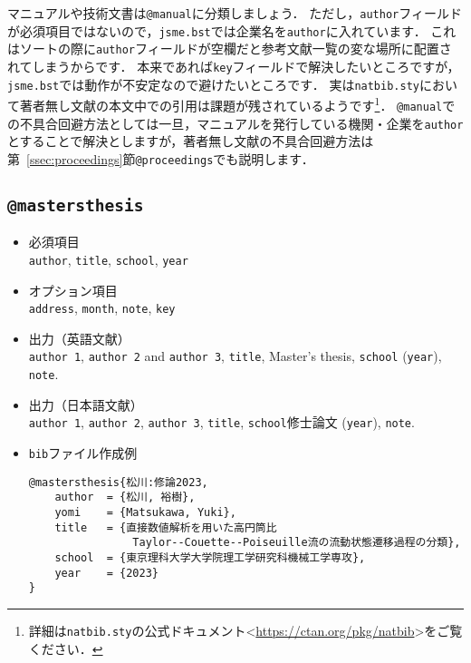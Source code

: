 \documentclass[a4paper,fleqn,uplatex,dvipdfmx]{jsarticle}
\makeatletter
\newcommand{\jsmefile}{\texttt{jsme.bst}}
\newcommand{\ttmanual}{\texttt{@manual}}
\newcommand{\ttmastersthesis}{\texttt{@mastersthesis}}
\newcommand{\ttproceedings}{\texttt{@proceedings}}
\makeatother
\begin{document}
マニュアルや技術文書は\ttmanual に分類しましょう．
ただし，\verb|author|フィールドが必須項目ではないので，\jsmefile では企業名を\verb|author|に入れています．
これはソートの際に\verb|author|フィールドが空欄だと参考文献一覧の変な場所に配置されてしまうからです．
本来であれば\verb|key|フィールドで解決したいところですが，\jsmefile では動作が不安定なので避けたいところです．
実は\verb|natbib.sty|において著者無し文献の本文中での引用は課題が残されているようです\footnote{詳細は\texttt{natbib.sty}の公式ドキュメント\textless\url{https://ctan.org/pkg/natbib}\textgreater をご覧ください．}．
\ttmanual での不具合回避方法としては一旦，マニュアルを発行している機関・企業を\verb|author|とすることで解決としますが，著者無し文献の不具合回避方法は第~\ref{ssec:proceedings}節\ttproceedings でも説明します．


\subsection{\ttmastersthesis}
\label{ssec:mastersthesis}
\begin{screen}
    \begin{itemize}
        \item 必須項目 \\
        \verb|author|, \verb|title|, \verb|school|, \verb|year|
        \item オプション項目 \\
        \verb|address|, \verb|month|, \verb|note|, \verb|key|
        \item 出力（英語文献） \\
            \colorbox[gray]{0.8}{\texttt{author 1}}, \colorbox[gray]{0.8}{\texttt{author 2}} and \colorbox[gray]{0.8}{\texttt{author 3}}, \colorbox[gray]{0.8}{\texttt{title}}, Master's thesis, \colorbox[gray]{0.8}{\texttt{school}} (\colorbox[gray]{0.8}{\texttt{year}}), \colorbox[gray]{0.8}{\texttt{note}}.
        \item 出力（日本語文献） \\
            \colorbox[gray]{0.8}{\texttt{author 1}}, \colorbox[gray]{0.8}{\texttt{author 2}}, \colorbox[gray]{0.8}{\texttt{author 3}}, \colorbox[gray]{0.8}{\texttt{title}}, \colorbox[gray]{0.8}{\texttt{school}}修士論文 (\colorbox[gray]{0.8}{\texttt{year}}), \colorbox[gray]{0.8}{\texttt{note}}.
        \item \verb|bib|ファイル作成例 \vspace{-3mm}
\begin{verbatim}
@mastersthesis{松川:修論2023,
    author  = {松川, 裕樹},
    yomi    = {Matsukawa, Yuki},
    title   = {直接数値解析を用いた高円筒比
                Taylor--Couette--Poiseuille流の流動状態遷移過程の分類},
    school  = {東京理科大学大学院理工学研究科機械工学専攻},
    year    = {2023}
}
\end{verbatim}
    \end{itemize}
\end{screen}
\end{document}
